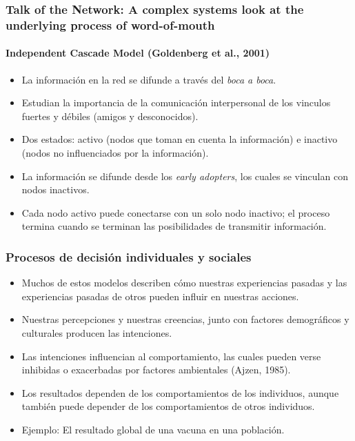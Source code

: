 \documentclass[11pt]{beamer}
\begin{document}
\begin{frame}
	\frametitle{\normalsize Talk of the Network: A complex systems look at the underlying process of word-of-mouth}
	\framesubtitle{Independent Cascade Model (Goldenberg et al., 2001)}
	\begin{itemize}
			\item La información en la red se difunde a través del \textit{boca a boca}.
			\item Estudian la importancia de la comunicación interpersonal de los vinculos fuertes y débiles (amigos y desconocidos).
			\item Dos estados: activo (nodos que toman en cuenta la información) e inactivo (nodos no influenciados por la información).
			\item La información se difunde desde los \textit{early adopters}, los cuales se vinculan con nodos inactivos.
			\item Cada nodo activo puede conectarse con un solo nodo inactivo; el proceso termina cuando se terminan las posibilidades de transmitir información.
	\end{itemize}
\end{frame}



\begin{frame}
	\frametitle{Procesos de decisión individuales y sociales}
	\begin{itemize}
		\item Muchos de estos modelos describen cómo nuestras experiencias pasadas y las experiencias pasadas de otros pueden influir en nuestras acciones.
		\item Nuestras percepciones y nuestras creencias, junto con factores demográficos y culturales producen las intenciones.
		\item Las intenciones influencian al comportamiento, las cuales pueden verse inhibidas o exacerbadas por factores ambientales (Ajzen, 1985).
		\item Los resultados dependen de los comportamientos de los individuos, aunque también puede depender de los comportamientos de otros individuos. 
		\item Ejemplo: El resultado global de una vacuna en una población.
	\end{itemize}
\end{frame}
\end{document}
